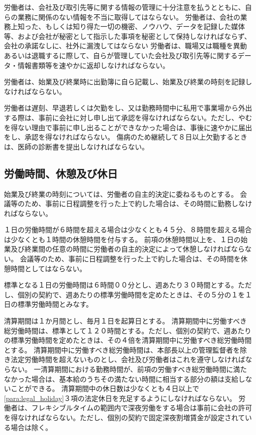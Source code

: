 \documentclass[10pt,a4paper,uplatex]{jsarticle}
\begin{document}
労働者は、会社及び取引先等に関する情報の管理に十分注意を払うとともに、自らの業務に関係のない情報を不当に取得してはならない。
\label{para:confidentiality}
\term
労働者は、会社の業務上知った、もしくは知り得た一切の機密、ノウハウ、データを記録した媒体等、および会社が秘密として指示した事項を秘密として保持しなければならず、会社の承諾なしに、社外に漏洩してはならない
\term
労働者は、職場又は職種を異動あるいは退職するに際して、自らが管理していた会社及び取引先等に関するデータ・情報書類等を速やかに返却しなければならない。

労働者は、始業及び終業時に出勤簿に自ら記載し、始業及び終業の時刻を記録しなければならない。

労働者は遅刻、早退若しくは欠勤をし、又は勤務時間中に私用で事業場から外出する際は、事前に会社に対し申し出て承認を得なければならない。ただし、やむを得ない理由で事前に申し出ることができなかった場合は、事後に速やかに届出をし、承認を得なければならない。
\term
傷病のため継続して８日以上欠勤するときは、医師の診断書を提出しなければならない。




\subsection{労働時間、休憩及び休日}

\label{para:time}
始業及び終業の時刻については、労働者の自主的決定に委ねるものとする。
\term
会議等のため、事前に日程調整を行った上で約した場合は、その時間に勤務しなければならない。

１日の労働時間が６時間を超える場合は少なくとも４５分、８時間を超える場合は少なくとも１時間の休憩時間を付与する。
\term
前項の休憩時間以上を、１日の始業及び終業間の任意の時間に労働者の自主的決定によって休憩しなければならない。
\term
会議等のため、事前に日程調整を行った上で約した場合は、その時間を休憩時間としてはならない。

\label{para:standardworktime}
標準となる１日の労働時間は６時間００分とし、週あたり３０時間とする。ただし、個別の契約で、週あたりの標準労働時間を定めたときは、その５分の１を１日の標準労働時間とみなす。

清算期間は１か月間とし、毎月１日を起算日とする。
\term
清算期間中に労働すべき総労働時間は、標準として１２０時間とする。ただし、個別の契約で、週あたりの標準労働時間を定めたときは、その４倍を清算期間中に労働すべき総労働時間とする。
\term
清算期間中に労働すべき総労働時間は、本部長以上の管理監督者を除き法定労働時間を超えないものとし、会社及び労働者はこれを遵守しなければならない。
\term
一清算期間における勤務時間が、前項の労働すべき総労働時間に満たなかった場合は、基本給のうちその満たない時間に相当する部分の額は支給しないことができる。
\label{para:totalworktime}
\term
清算期間中の休日数は少なくとも４日以上で\ref{para:legal_holiday}３項の法定休日を充足するようにしなければならない。
\term
労働者は、フレキシブルタイムの範囲内で深夜労働をする場合は事前に会社の許可を得なければならない。ただし、個別の契約で固定深夜割増賃金が設定されている場合は除く。
\end{document}
